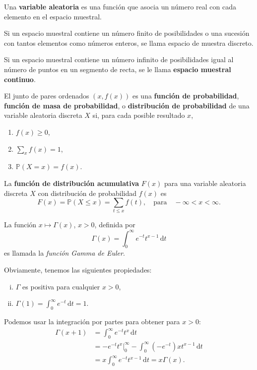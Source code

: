 \begin{definition}[]
Una \textbf{variable aleatoria} es una función que asocia un número real con cada elemento en el espacio muestral.
\end{definition}

\begin{definition}[]
Si un espacio muestral contiene un número finito de posibilidades o una sucesión con tantos elementos como  números enteros, se llama espacio de muestra discreto.
\end{definition}

\begin{definition}[]
Si un espacio muestral contiene un número infinito de posibilidades igual al número de puntos en un segmento de recta, se le llama \textbf{espacio muestral continuo}.
\end{definition}

\begin{definition}[]
El junto de pares ordenados $\left(x,f(x)\right)$ es una \textbf{función de probabilidad}, \textbf{función de masa de probabilidad}, o \textbf{distribución de probabilidad} de una variable aleatoria discreta $X$ si, para cada posible resultado $x$,
\begin{enumerate}
	\item $f(x)\ge 0$,
	\item $\displaystyle\sum_{x}f(x)=1$,
	\item $\mathds{P}\left(X=x\right)=f(x)$.
\end{enumerate}
\end{definition}

\begin{definition}[]
La \textbf{función de distribución acumulativa} $F(x)$ para una variable aleatoria discreta $X$ con distribución de probabilidad $f(x)$ es
\begin{equation*}
F(x)=\mathds{P}(X\le x)=\sum_{t\le x} f(t),\quad\text{para}\quad -\infty<x<\infty.
\end{equation*}
\end{definition}

\begin{definition}
La función $x\mapsto \Gamma(x)$, $x>0$, definida por
\begin{equation}
\Gamma(x)=\int_{0}^{\infty}e^{-t}t^{x-1}\,\mathrm{d}t
\end{equation}
es llamada la \emph{función Gamma de Euler}.
\end{definition}
Obviamente, tenemos las siguientes propiedades:
\begin{enumerate}[(i)]
	\item $\Gamma$ es positiva para cualquier $x>0$,
	\item $\Gamma(1)=\int_0^\infty e^{-t}\,\mathrm{d}t=1$.
\end{enumerate}
Podemos usar la integración por partes para obtener para $x>0$:
\begin{align*}
\Gamma(x+1) &= \int_{0}^{\infty}e^{-t}t^{x}\,\mathrm{d}t\\
						&=-e^{-t}t^{x}\Big|_0^\infty - \int_{0}^{\infty}\left(-e^{-t}\right)xt^{x-1}\,\mathrm{d}t\\
						&=x\int_{0}^{\infty}e^{-t}t^{x-1}\,\mathrm{d}t=x\Gamma(x).
\end{align*}